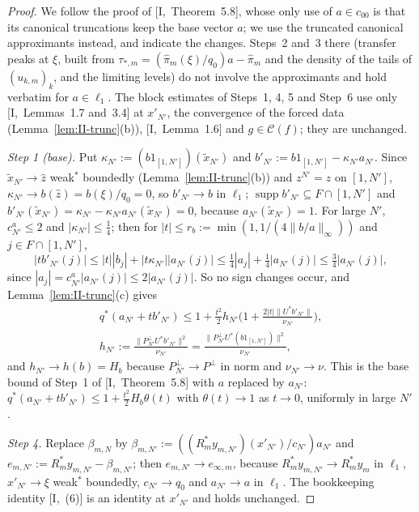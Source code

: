 \documentclass[10pt]{amsart}
\theoremstyle{definition}
\theoremstyle{remark}
\newcommand{\supp}{\operatorname{supp}}
\newcommand{\Cset}{\mathcal C}
\newcommand{\zh}{\hat z}
\begin{document}
\begin{proof}
We follow the proof of [I,~Theorem~5.8], whose only use of $a\in c_{00}$
is that its canonical truncations keep the base vector $a$; we use the
truncated canonical approximants instead, and indicate the changes.
Steps~2 and~3 there (transfer peaks at $\xi$, built from
$\tau_{*,m}=(\hat\pi_m(\xi)/q_0)a-\hat\pi_m$ and the density of the tails of
$(u_{k,m})_k$, and the limiting levels) do not involve the approximants and
hold verbatim for $a\in\ell_1$.  The block estimates of Steps~1, 4, 5 and
Step~6 use only [I,~Lemmas~1.7 and~3.4] at $x'_{N'}$, the convergence of the
forced data (Lemma~\ref{lem:II-trunc}(b)), [I,~Lemma~1.6] and $g\in
\Cset(f)$; they are unchanged.

\emph{Step 1 (base).}  Put $\kappa_{N'}:=(b1_{[1,N']})(\tilde x_{N'})$ and
$b'_{N'}:=b1_{[1,N']}-\kappa_{N'}a_{N'}$.  Since $\tilde x_{N'}\to\zh$
weak$^*$ boundedly (Lemma~\ref{lem:II-trunc}(b)) and $z^{N'}=z$ on
$[1,N']$, $\kappa_{N'}\to b(\zh)=b(\xi)/q_0=0$, so $b'_{N'}\to b$ in
$\ell_1$; $\supp b'_{N'}\subseteq F\cap[1,N']$ and $b'_{N'}(\tilde
x_{N'})=\kappa_{N'}-\kappa_{N'}a_{N'}(\tilde x_{N'})=0$, because
$a_{N'}(\tilde x_{N'})=1$.  For large $N'$, $c^a_{N'}\le2$ and
$|\kappa_{N'}|\le\frac14$; then for $|t|\le r_b:=\min(1,1/(4\|b/a\|_\infty))$
and $j\in F\cap[1,N']$,
\[
 |tb'_{N'}(j)|\le|t||b_j|+|t\kappa_{N'}||a_{N'}(j)|\le\tfrac14|a_j|+
 \tfrac14|a_{N'}(j)|\le\tfrac34|a_{N'}(j)|,
\]
since $|a_j|=c^a_{N'}|a_{N'}(j)|\le2|a_{N'}(j)|$.  So no sign changes
occur, and Lemma~\ref{lem:II-trunc}(c) gives
\begin{gather*}
 q^*(a_{N'}+tb'_{N'})\le1+\frac{t^2}2h_{N'}\Big(1+\frac{2|t|\|U^*b'_{N'}\|}
 {\nu_{N'}}\Big),\\ h_{N'}:=\frac{\|P^\perp_{N'}U^*b'_{N'}\|^2}{\nu_{N'}}
 =\frac{\|P^\perp_{N'}U^*(b1_{[1,N']})\|^2}{\nu_{N'}},
\end{gather*}
and $h_{N'}\to h(b)=H_b$ because $P^\perp_{N'}\to P^\perp$ in norm and
$\nu_{N'}\to\nu$.  This is the base bound of Step~1 of [I,~Theorem~5.8]
with $a$ replaced by $a_{N'}$: $q^*(a_{N'}+tb'_{N'})\le1+\frac{t^2}2H_b
\theta(t)$ with $\theta(t)\to1$ as $t\to0$, uniformly in large $N'$.

\emph{Step 4.}  Replace $\beta_{m,N}$ by $\beta_{m,N'}:=((R_m^*y_{m,N'})
(x'_{N'})/c_{N'})a_{N'}$ and $e_{m,N'}:=R_m^*y_{m,N'}-\beta_{m,N'}$; then
$e_{m,N'}\to e_{\infty,m}$, because $R_m^*y_{m,N'}\to R_m^*y_m$ in $\ell_1$,
$x'_{N'}\to\xi$ weak$^*$ boundedly, $c_{N'}\to q_0$ and $a_{N'}\to a$ in
$\ell_1$.  The bookkeeping identity [I,~(6)] is an identity at $x'_{N'}$
and holds unchanged.


\end{proof}
\end{document}
